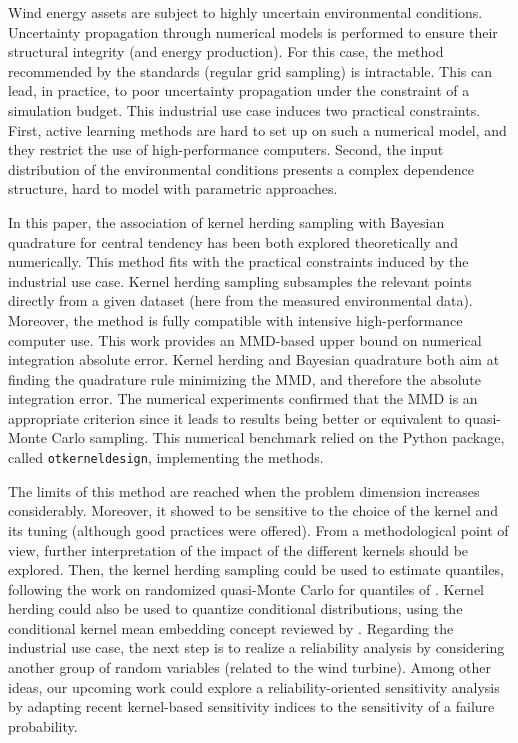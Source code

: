 Wind energy assets are subject to highly uncertain environmental conditions. 
Uncertainty propagation through numerical models is performed to ensure their structural integrity (and energy production). 
For this case, the method recommended by the standards (regular grid sampling) is intractable. 
This can lead, in practice, to poor uncertainty propagation under the constraint of a simulation budget. 
This industrial use case induces two practical constraints. 
First, active learning methods are hard to set up on such a numerical model, and they restrict the use of high-performance computers. 
Second, the input distribution of the environmental conditions presents a complex dependence structure, hard to model with parametric approaches. 

In this paper, the association of kernel herding sampling with Bayesian quadrature for central tendency has been both explored theoretically and numerically. 
This method fits with the practical constraints induced by the industrial use case. 
Kernel herding sampling subsamples the relevant points directly from a given dataset (here from the measured environmental data). 
Moreover, the method is fully compatible with intensive high-performance computer use. This work provides an MMD-based upper bound on numerical integration absolute error. 
Kernel herding and Bayesian quadrature both aim at finding the quadrature rule minimizing the MMD, and therefore the absolute integration error. 
The numerical experiments confirmed that the MMD is an appropriate criterion since it leads to results being better or equivalent to quasi-Monte Carlo sampling. 
This numerical benchmark relied on the Python package, called \texttt{otkerneldesign}, implementing the methods. 

The limits of this method are reached when the problem dimension increases considerably. 
Moreover, it showed to be sensitive to the choice of the kernel and its tuning (although good practices were offered). 
From a methodological point of view, further interpretation of the impact of the different kernels should be explored. 
Then, the kernel herding sampling could be used to estimate quantiles, following the work on randomized quasi-Monte Carlo for quantiles of \cite{tuffin_2019}. 
Kernel herding could also be used to quantize conditional distributions, using the conditional kernel mean embedding concept reviewed by \cite{sullivan_2020}. 
Regarding the industrial use case, the next step is to realize a reliability analysis by considering another group of random variables (related to the wind turbine). 
Among other ideas, our upcoming work could explore a reliability-oriented sensitivity analysis by adapting recent kernel-based sensitivity indices \citep{marrel_chabridon_2021} to the sensitivity of a failure probability.


